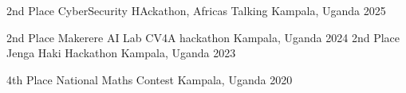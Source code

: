 \begin{cvhonors}

  \cvhonor
    {2nd Place} %
    {CyberSecurity HAckathon, Africas Talking} %
    {Kampala, Uganda} %
    {2025} %

  \cvhonor
    {2nd Place} %
    {Makerere AI Lab CV4A hackathon} %
    {Kampala, Uganda} %
    {2024} %
  \cvhonor
    {2nd Place} %
    {Jenga Haki Hackathon} %
    {Kampala, Uganda} %
    {2023} %

  \cvhonor
    {4th Place} %
    {National Maths Contest} %
    {Kampala, Uganda} %
    {2020} %

\end{cvhonors}






